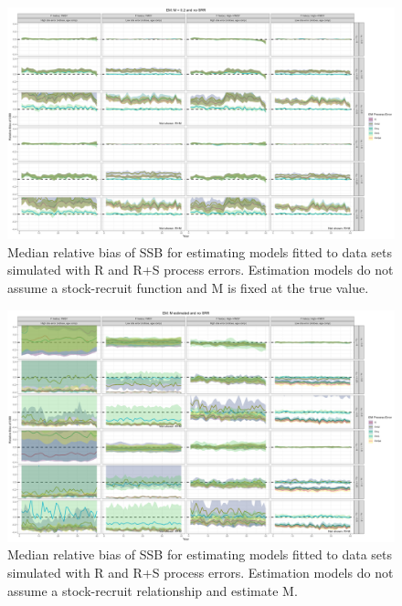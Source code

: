 \documentclass[
  12pt,
]{article}
\begin{document}
\clearpage

\begin{landscape}
\begin{figure}
\caption{Median relative bias of SSB for estimating models fitted to data sets simulated with R and R+S process errors.  Estimation models do not assume a stock-recruit function and M is fixed at the true value.}\label{naa_om_em_R_MF_relbias_ssb}
\begin{center}
\includegraphics[width = \textwidth]{naa_om_R_MF_relbias_ssb.png}
\end{center}
\end{figure}
\end{landscape}

\begin{landscape}
\begin{figure}
\caption{Median relative bias of SSB for estimating models fitted to data sets simulated with R and R+S process errors. Estimation models do not assume a stock-recruit relationship and estimate M.}\label{naa_om_em_R_ME_relbias_ssb}
\begin{center}
\includegraphics[width = \textwidth]{naa_om_R_ME_relbias_ssb.png}
\end{center}
\end{figure}
\end{landscape}
\end{document}
